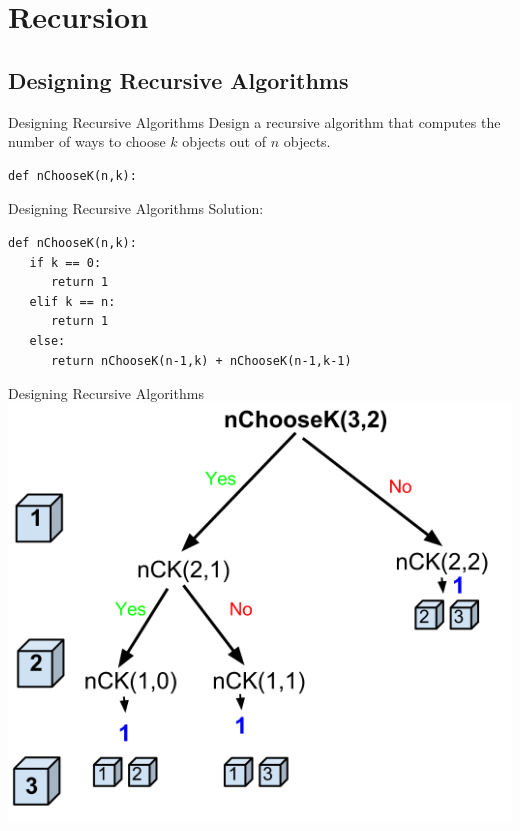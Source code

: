 \documentclass[9pt]{beamer}
\begin{document}
\section{Recursion}
\subsection{Designing Recursive Algorithms}
\begin{frame}[fragile]{Designing Recursive Algorithms}
  Design a recursive algorithm that computes the number of ways to choose
  $k$ objects out of $n$ objects.

  \begin{lstlisting}[numbers=none, frame=none, xleftmargin=0pt]
def nChooseK(n,k):
  \end{lstlisting}
\end{frame}

\begin{frame}[fragile]{Designing Recursive Algorithms}
  Solution:

  \begin{lstlisting}
def nChooseK(n,k):
   if k == 0:
      return 1
   elif k == n:
      return 1
   else:
      return nChooseK(n-1,k) + nChooseK(n-1,k-1)
  \end{lstlisting}
\end{frame}

\begin{frame}[fragile]{Designing Recursive Algorithms}
  \includegraphics[scale=0.5]{nChooseK.png}
\end{frame}
\end{document}
